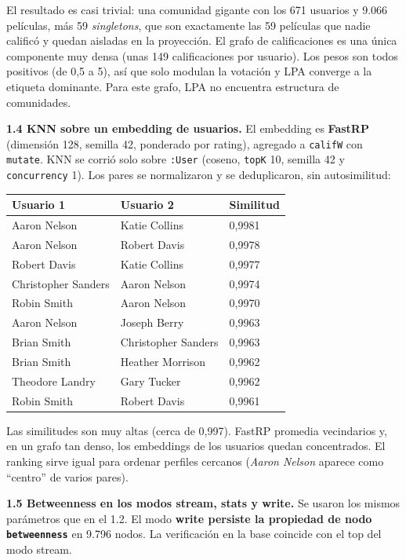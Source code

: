 \documentclass[
  spanish,
  10pt,
]{article}
\newcounter{none} %
\begin{document}
El resultado es casi trivial: una comunidad gigante con los 671 usuarios
y 9.066 películas, más 59 \emph{singletons}, que son exactamente las 59
películas que nadie calificó y quedan aisladas en la proyección. El
grafo de calificaciones es una única componente muy densa (unas 149
calificaciones por usuario). Los pesos son todos positivos (de 0,5 a 5),
así que solo modulan la votación y LPA converge a la etiqueta dominante.
Para este grafo, LPA no encuentra estructura de comunidades.

\textbf{1.4 KNN sobre un embedding de usuarios.} El embedding es
\textbf{FastRP} (dimensión 128, semilla 42, ponderado por rating),
agregado a \texttt{califW} con \texttt{mutate}. KNN se corrió solo sobre
\texttt{:User} (coseno, \texttt{topK} 10, semilla 42 y
\texttt{concurrency} 1). Los pares se normalizaron y se deduplicaron,
sin autosimilitud:

{\def\LTcaptype{none} %
\begin{longtable}[]{@{}lll@{}}
\toprule\noalign{}
Usuario 1 & Usuario 2 & Similitud \\
\midrule\noalign{}
\endhead
\bottomrule\noalign{}
\endlastfoot
Aaron Nelson & Katie Collins & 0,9981 \\
Aaron Nelson & Robert Davis & 0,9978 \\
Robert Davis & Katie Collins & 0,9977 \\
Christopher Sanders & Aaron Nelson & 0,9974 \\
Robin Smith & Aaron Nelson & 0,9970 \\
Aaron Nelson & Joseph Berry & 0,9963 \\
Brian Smith & Christopher Sanders & 0,9963 \\
Brian Smith & Heather Morrison & 0,9962 \\
Theodore Landry & Gary Tucker & 0,9962 \\
Robin Smith & Robert Davis & 0,9961 \\
\end{longtable}
}

Las similitudes son muy altas (cerca de 0,997). FastRP promedia
vecindarios y, en un grafo tan denso, los embeddings de los usuarios
quedan concentrados. El ranking sirve igual para ordenar perfiles
cercanos (\emph{Aaron Nelson} aparece como ``centro'' de varios pares).

\textbf{1.5 Betweenness en los modos stream, stats y write.} Se usaron
los mismos parámetros que en el 1.2. El modo \textbf{write persiste la
propiedad de nodo \texttt{betweenness}} en 9.796 nodos. La verificación
en la base coincide con el top del modo stream.
\end{document}
